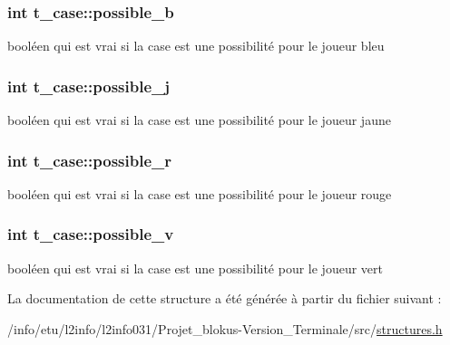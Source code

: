 \subsubsection[{\texorpdfstring{possible\+\_\+b}{possible_b}}]{\setlength{\rightskip}{0pt plus 5cm}int t\+\_\+case\+::possible\+\_\+b}\hypertarget{structt__case_aea7d8d23a697e3cd7b07a44e88f5781b}{}\label{structt__case_aea7d8d23a697e3cd7b07a44e88f5781b}
booléen qui est vrai si la case est une possibilité pour le joueur bleu 
\subsubsection[{\texorpdfstring{possible\+\_\+j}{possible_j}}]{\setlength{\rightskip}{0pt plus 5cm}int t\+\_\+case\+::possible\+\_\+j}\hypertarget{structt__case_a7ba4c0e092015a53344116cc2e54f2dc}{}\label{structt__case_a7ba4c0e092015a53344116cc2e54f2dc}
booléen qui est vrai si la case est une possibilité pour le joueur jaune 
\subsubsection[{\texorpdfstring{possible\+\_\+r}{possible_r}}]{\setlength{\rightskip}{0pt plus 5cm}int t\+\_\+case\+::possible\+\_\+r}\hypertarget{structt__case_abfbade6a8fc1927fbdb8dca9c810b1c4}{}\label{structt__case_abfbade6a8fc1927fbdb8dca9c810b1c4}
booléen qui est vrai si la case est une possibilité pour le joueur rouge 
\subsubsection[{\texorpdfstring{possible\+\_\+v}{possible_v}}]{\setlength{\rightskip}{0pt plus 5cm}int t\+\_\+case\+::possible\+\_\+v}\hypertarget{structt__case_a74e4a7aa37b5071dfc9a4da15d88cc7d}{}\label{structt__case_a74e4a7aa37b5071dfc9a4da15d88cc7d}
booléen qui est vrai si la case est une possibilité pour le joueur vert 

La documentation de cette structure a été générée à partir du fichier suivant \+:\begin{DoxyCompactItemize}
\item 
/info/etu/l2info/l2info031/\+Projet\+\_\+blokus-\/\+Version\+\_\+\+Terminale/src/\hyperlink{structures_8h}{structures.\+h}\end{DoxyCompactItemize}

